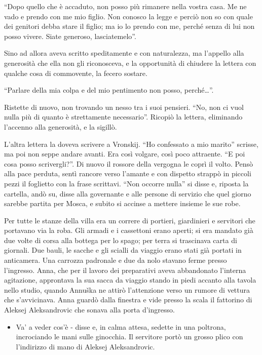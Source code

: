 ``Dopo quello che è accaduto, non posso più rimanere nella vostra casa. Me ne vado e prendo con me mio figlio. Non conosco la legge e perciò non so con quale dei genitori debba stare il figlio; ma io lo prendo con me, perché senza di lui non posso vivere. Siate generoso, lasciatemelo''. 

Sino ad allora aveva scritto speditamente e con naturalezza, ma l'appello alla generosità che ella non gli riconosceva, e la opportunità di chiudere la lettera con qualche cosa di commovente, la fecero sostare. 

``Parlare della mia colpa e del mio pentimento non posso, perché\ldots{}''. 

Ristette di nuovo, non trovando un nesso tra i suoi pensieri. ``No, non ci vuol nulla più di quanto è strettamente necessario''. Ricopiò la lettera, eliminando l'accenno alla generosità, e la sigillò. 

L'altra lettera la doveva scrivere a Vronskij. ``Ho confessato a mio marito'' scrisse, ma poi non seppe andare avanti. Era così volgare, così poco attraente. ``E poi cosa posso scrivergli?''. Di nuovo il rossore della vergogna le coprì il volto. Pensò alla pace perduta, sentì rancore verso l'amante e con dispetto strappò in piccoli pezzi il foglietto con la frase scrittavi. ``Non occorre nulla'' si disse e, riposta la cartella, andò su, disse alla governante e alle persone di servizio che quel giorno sarebbe partita per Mosca, e subito si accinse a mettere insieme le sue robe. 

\label{xvi-2} 

Per tutte le stanze della villa era un correre di portieri, giardinieri e servitori che portavano via la roba. Gli armadi e i cassettoni erano aperti; si era mandato già due volte di corsa alla bottega per lo spago; per terra si trascinava carta di giornali. Due bauli, le sacche e gli scialli da viaggio erano stati già portati in anticamera. Una carrozza padronale e due da nolo stavano ferme presso l'ingresso. Anna, che per il lavoro dei preparativi aveva abbandonato l'interna agitazione, approntava la sua sacca da viaggio stando in piedi accanto alla tavola nello studio, quando Annuška ne attirò l'attenzione verso un rumore di vettura che s'avvicinava. Anna guardò dalla finestra e vide presso la scala il fattorino di Aleksej Aleksandrovic che sonava alla porta d'ingresso. 

\begin{itemize} \itemsep1pt\parskip0pt \item Va' a veder cos'è - disse e, in calma attesa, sedette in una poltrona, incrociando le mani sulle ginocchia. Il servitore portò un grosso plico con l'indirizzo di mano di Aleksej Aleksandrovic. \end{itemize} 

